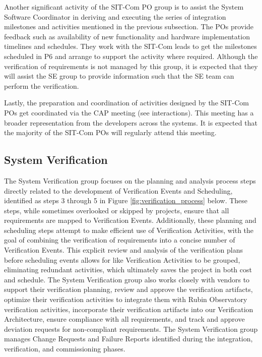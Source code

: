 \documentclass[SE,lsstdraft,authoryear,toc]{lsstdoc}
\begin{document}
Another significant activity of the SIT-Com PO group is to assist the System Software Coordinator in deriving and executing the series of integration milestones and activities mentioned in the previous subsection.
The POs provide feedback such as availability of new functionality and hardware implementation timelines and schedules.
They work with the SIT-Com leads to get the milestones scheduled in P6 and arrange to support the activity where required.
Although the verification of requirements is not managed by this group, it is expected that they will assist the SE group to provide information such that the SE team can perform the verification.

Lastly, the preparation and coordination of activities designed by the SIT-Com POs get coordinated via the CAP meeting (see interactions). This meeting has a broader representation from the developers across the systems. It is expected that the majority of the SIT-Com POs will regularly attend this meeting.

\subsection{System Verification}
The System Verification group focuses on the planning and analysis process steps directly related to the development of Verification Events and Scheduling, identified as steps 3 through 5 in Figure \ref{fig:verification_process} below.
These steps, while sometimes overlooked or skipped by projects, ensure that all requirements are mapped to Verification Events.
Additionally, these planning and scheduling steps attempt to make efficient use of Verification Activities, with the goal of combining the verification of requirements into a concise number of Verification Events. 
This explicit review and analysis of the verification plans before scheduling events allows for like Verification Activities to be grouped, eliminating redundant activities, which ultimately saves the project in both cost and schedule.
The System Verification group also works closely with vendors to support their verification planning, review and approve the verification artifacts, optimize their verification activities to integrate them with Rubin Observatory verification activities, incorporate their verification artifacts into our Verification Architecture, ensure compliance with all requirements, and track and approve deviation requests for non-compliant requirements. 
The System Verification group manages Change Requests and Failure Reports identified during the integration, verification, and commissioning phases.
\end{document}
